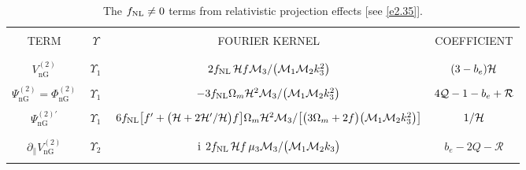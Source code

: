 
%
\begingroup
\tiny
\begin{longtable}{| c | c | c | c |} 
\caption{{The $f_\text{NL} \neq 0$ terms from relativistic projection effects [see \eqref{e2.35}].}} \label{tabc3} \\
\hline 
&  &  & \\
TERM & $~~\Upsilon~~$ & FOURIER KERNEL  & COEFFICIENT \\ 
&  &  & \\ \hline \hline
&  &  & \\ 
$V^{(2)}_{\mathrm{nG}}$ & $\Upsilon_{1}$ & ${2f_\text{NL}\, \mathcal{H} f {\cal M}_3/\big({\cal M}_1 {\cal M}_2 k_3^2\big)}$ & $(3-b_{e})\mathcal{H}$ \\ 
&  &  & \\
$\Psi^{(2)}_{\mathrm{nG}}=\Phi^{(2)}_{\mathrm{nG}}$ & $\Upsilon_{1}$ & ${-3f_\text{NL}\Omega_m \mathcal{H}^{2}{\cal M}_3/\big({\cal M}_1 {\cal M}_2 k_3^2\big)}$ & ${4{\cal Q}-1-b_e+{\cal R} }$ \\ 
&  &  & \\
${\Psi^{(2)\prime}_{\mathrm{nG}}}$ & $\Upsilon_{1}$ & ${6f_\text{NL}\big[f' +\big(\mathcal{H}+2\mathcal{H}'/\mathcal{H} \big)f \big]\Omega_m \mathcal{H}^{2}{\cal M}_3/\big[\big( 3\Omega_m+2f\big) \big({\cal M}_1 {\cal M}_2 k_3^2\big)\big]}$ & $1/\mathcal{H}$ \\ 
&  &  & \\
\hline 
&  &  & \\
$ \partial_{\parallel}V^{(2)}_{\mathrm{nG}}$ & $\Upsilon_2$ & $\mathrm{i\,}\;{2f_\text{NL}\, \mathcal{H} f \,\mu_3{\cal M}_3/\big({\cal M}_1 {\cal M}_2 k_3\big)}$ & $b_{e}-2Q-\mathcal{R}$ \\ 
&  &  & \\
\hline 

\end{longtable}
